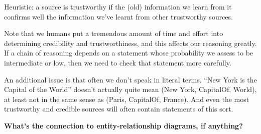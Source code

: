 Heuristic: a source is trustworthy if the (old) information we learn
from it confirms well the information we've learnt from other
trustworthy sources.

Note that we humans put a tremendous amount of time and effort into
determining credibility and trustworthiness, and this affects our
reasoning greatly.  If a chain of reasoning depends on a statement
whose probability we assess to be intermediate or low, then we need to
check that statement more carefully.

An additional issue is that often we don't speak in literal terms.
``New York is the Capital of the World'' doesn't actually quite mean
(New York, CapitalOf, World), at least not in the same sense as
(Paris, CapitalOf, France).  And even the most trustworthy and
credible sources will often contain statements of this sort.

\textbf{What's the connection to entity-relationship diagrams, if
  anything?}

